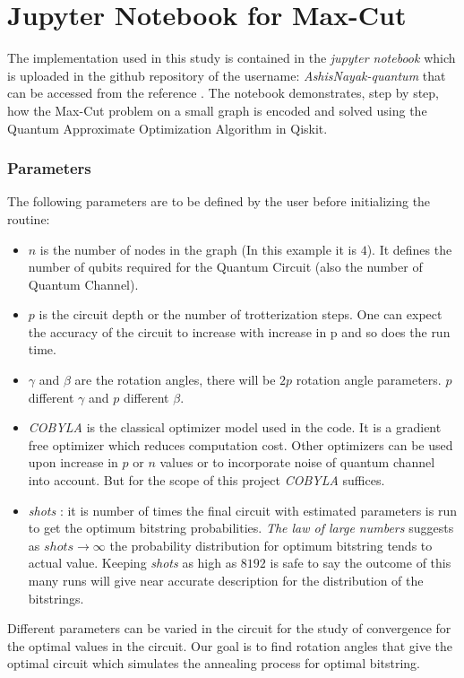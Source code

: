 \documentclass[english,12pt,a4paper]{report}
\begin{document}
    \appendix
	\chapter{Jupyter Notebook for Max-Cut }\label{app}

	\hspace{1.15em}The implementation used in this study is contained in the \emph{\textit{jupyter notebook}} which is uploaded in the github repository of the username: \textit{AshisNayak-quantum} that can be accessed from the reference \cite{Quantum-Machine-Learning-QAOA}. The notebook demonstrates, step by step, how the Max-Cut problem on a small graph is encoded and solved using the Quantum Approximate Optimization Algorithm in Qiskit. 
	\subsection*{Parameters}
	\hspace{1.15em}The following parameters are to be defined by the user before initializing the routine:
	\begin{itemize}
		\item $n$ is the number of nodes in the graph (In this example it is $4$). It defines the number of qubits required for the Quantum Circuit (also the number of Quantum Channel).
		\item $p$ is the circuit depth or the number of trotterization steps. One can expect the accuracy of the circuit to increase with increase in p and so does the run time.
		\item $\gamma$ and $\beta$ are the rotation angles, there will be $2p$ rotation angle parameters. $p$ different $\gamma$ and $p$ different $\beta$.
		\item \emph{COBYLA} is the classical optimizer model used in the code. It is a gradient free optimizer which reduces computation cost. Other optimizers can be used upon increase in $p$ or $n$ values or to incorporate noise of quantum channel into account. But for the scope of this project \emph{COBYLA} suffices.
		\item \emph{shots} : it is number of times the final circuit with estimated parameters is run to get the optimum bitstring probabilities. \emph{The law of large numbers} \cite{dekking2005modern} suggests as $shots\rightarrow \infty$ the probability distribution for optimum bitstring tends to actual value. Keeping \emph{shots} as high as $8192$ is safe to say the outcome of this many runs will give near accurate description for the distribution of the bitstrings.
	\end{itemize}
	Different parameters can be varied in the circuit for the study of convergence for the optimal values in the circuit. Our goal is to find rotation angles that give the optimal circuit which simulates the annealing process for optimal bitstring.
	
\end{document}
